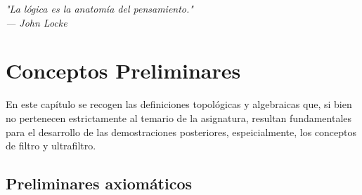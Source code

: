 \documentclass[titlepage,11pt,a4paper]{book}
\begin{document}



\cleardoublepage 
\thispagestyle{empty} 
\vspace*{5cm}
\begin{center}
    \itshape
    "La lógica es la anatomía del pensamiento." \\
    \vspace{0.3cm}
    --- John Locke
\end{center}


\frontmatter %

\cleardoublepage 
{} 
\pagestyle{empty} 

\tableofcontents

\cleardoublepage
{} %
\pagestyle{fancy}


\chapter{Conceptos Preliminares}

En este capítulo se recogen las definiciones topológicas y algebraicas que, si bien no pertenecen estrictamente al temario de la asignatura, resultan fundamentales para el desarrollo de las demostraciones posteriores, espeicialmente, los conceptos de filtro y ultrafiltro.

\section*{Preliminares axiomáticos}
\end{document}
